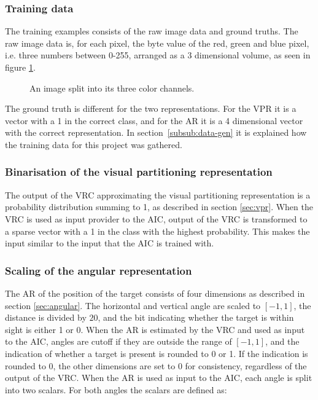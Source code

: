 \subsubsection{Training data}
The training examples consists of the raw image data and ground truths. The raw image data is, for each pixel, the byte value of the red, green and blue pixel, i.e. three numbers between 0-255, arranged as a 3 dimensional volume, as seen in figure \ref{fig:split}.

\begin{figure}[H]
    \centering
    
    \caption{An image split into its three color channels.}
    \label{fig:split}
\end{figure}
\noindent
The ground truth is different for the two representations. For the VPR it is a vector with a 1 in the correct class, and for the AR it is a 4 dimensional vector with the correct representation.
In section~\ref{subsub:data-gen} it is explained how the training data for this project was gathered.


\subsubsection{Binarisation of the visual partitioning representation}
The output of the VRC approximating the visual partitioning representation is a probability distribution summing to 1, as described in section \ref{sec:vpr}. When the VRC is used as input provider to the AIC, output of the VRC is transformed to a sparse vector with a 1 in the class with the highest probability. This makes the input similar to the input that the AIC is trained with.

\subsubsection{Scaling of the angular representation}
The AR of the position of the target consists of four dimensions as described in section \ref{sec:angular}. The horizontal and vertical angle are scaled to $[-1,1]$, the distance is divided by $20$, and the bit indicating whether the target is within sight is either 1 or 0. When the AR is estimated by the VRC and used as input to the AIC, angles are cutoff if they are outside the range of $[-1,1]$, and the indication of whether a target is present is rounded to 0 or 1. If the indication is rounded to 0, the other dimensions are set to 0 for consistency, regardless of the output of the VRC. When the AR is used as input to the AIC, each angle is split into two scalars. For both angles the scalars are defined as:

